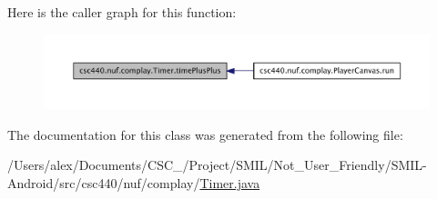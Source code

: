 Here is the caller graph for this function\-:
\nopagebreak
\begin{figure}[H]
\begin{center}
\leavevmode
\includegraphics[width=350pt]{classcsc440_1_1nuf_1_1complay_1_1_timer_aff1846d75c64aee648b2321f9ea62314_icgraph}
\end{center}
\end{figure}




The documentation for this class was generated from the following file\-:\begin{DoxyCompactItemize}
\item 
/\-Users/alex/\-Documents/\-C\-S\-C\-\_/\-Project/\-S\-M\-I\-L/\-Not\-\_\-\-User\-\_\-\-Friendly/\-S\-M\-I\-L-\/\-Android/src/csc440/nuf/complay/\hyperlink{_timer_8java}{Timer.\-java}\end{DoxyCompactItemize}
